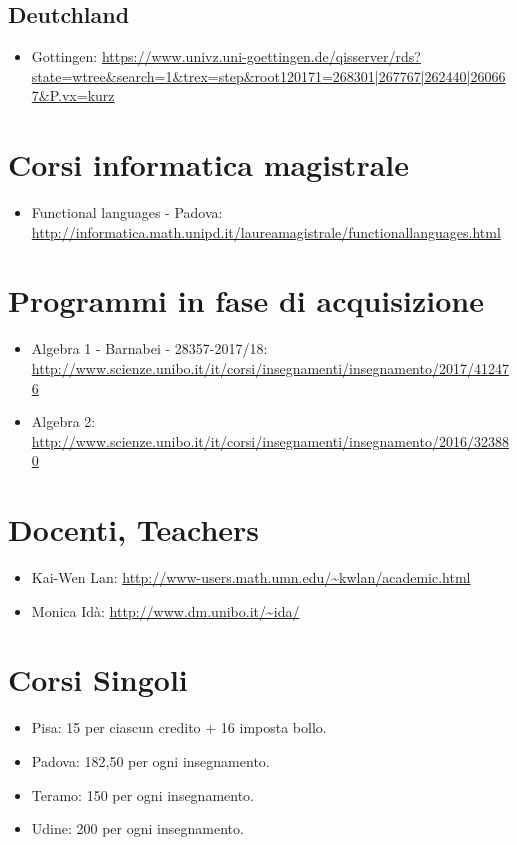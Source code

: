 \documentclass[a4paper,10pt]{article}
\begin{document}
\subsection{Deutchland}
\begin{itemize}
 \item Gottingen: \url{https://www.univz.uni-goettingen.de/qisserver/rds?state=wtree&search=1&trex=step&root120171=268301|267767|262440|260667&P.vx=kurz}
\end{itemize}


\section{Corsi informatica magistrale}
\begin{itemize}
 \item Functional languages - Padova: \url{http://informatica.math.unipd.it/laureamagistrale/functionallanguages.html}
\end{itemize}


\section{Programmi in fase di acquisizione}
\begin{itemize}
 \item Algebra 1 - Barnabei - 28357-2017/18: \url{http://www.scienze.unibo.it/it/corsi/insegnamenti/insegnamento/2017/412476}
 \item Algebra 2: \url{http://www.scienze.unibo.it/it/corsi/insegnamenti/insegnamento/2016/323880}
\end{itemize}

\section{Docenti, Teachers}
\begin{itemize}
 \item Kai-Wen Lan: \url{http://www-users.math.umn.edu/~kwlan/academic.html}
 \item Monica Idà: \url{http://www.dm.unibo.it/~ida/}
\end{itemize}


\section{Corsi Singoli}
\begin{itemize}
 \item Pisa: 15 per ciascun credito + 16 imposta bollo.
 \item Padova: 182,50 per ogni insegnamento.
 \item Teramo: 150 per ogni insegnamento.
 \item Udine: 200 per ogni insegnamento. 
\end{itemize}
\end{document}
